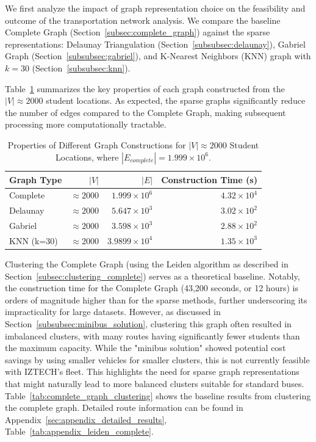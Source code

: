 We first analyze the impact of graph representation choice on the feasibility and outcome of the transportation network analysis. We compare the baseline Complete Graph (Section~\ref{subsec:complete_graph}) against the sparse representations: Delaunay Triangulation (Section~\ref{subsubsec:delaunay}), Gabriel Graph (Section~\ref{subsubsec:gabriel}), and K-Nearest Neighbors (KNN) graph with $k=30$ (Section~\ref{subsubsec:knn}).

Table~\ref{tab:graph_properties} summarizes the key properties of each graph constructed from the $|V| \approx 2000$ student locations. As expected, the sparse graphs significantly reduce the number of edges compared to the Complete Graph, making subsequent processing more computationally tractable.

\begin{table}[h]
\centering
\label{tab:graph_properties}
\begin{tabular}{lrrr}
\toprule
Graph Type & $|V|$ & $|E|$ & Construction Time (s) \\
\midrule
Complete & $\approx 2000$ & $1.999 \times 10^{6}$ & $4.32 \times 10^{4}$ \\
Delaunay & $\approx 2000$ & $5.647 \times 10^{3}$ & $3.02 \times 10^{2}$ \\
Gabriel & $\approx 2000$ & $3.598 \times 10^{3}$ & $2.88 \times 10^{2}$ \\
KNN (k=30) & $\approx 2000$ & $3.9899 \times 10^{4}$ & $1.35 \times 10^{3}$ \\
\bottomrule
\end{tabular}
\caption{Properties of Different Graph Constructions for $|V| \approx 2000$ Student Locations, where $|E_{complete}| = 1.999 \times 10^{6}$.}
\end{table}

Clustering the Complete Graph (using the Leiden algorithm as described in Section~\ref{subsec:clustering_complete}) serves as a theoretical baseline. Notably, the construction time for the Complete Graph (43,200 seconds, or 12 hours) is orders of magnitude higher than for the sparse methods, further underscoring its impracticality for large datasets. However, as discussed in Section~\ref{subsubsec:minibus_solution}, clustering this graph often resulted in imbalanced clusters, with many routes having significantly fewer students than the maximum capacity. While the "minibus solution" showed potential cost savings by using smaller vehicles for smaller clusters, this is not currently feasible with IZTECH's fleet. This highlights the need for sparse graph representations that might naturally lead to more balanced clusters suitable for standard buses. Table~\ref{tab:complete_graph_clustering} shows the baseline results from clustering the complete graph. Detailed route information can be found in Appendix~\ref{sec:appendix_detailed_results}, Table~\ref{tab:appendix_leiden_complete}.

